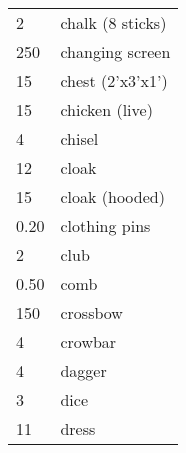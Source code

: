 \begin{normbox}[Equipment]
\begin{tabularx}{\linewidth}{@{} l X }
2 & chalk (8 sticks)\\
250 & changing screen\\
15 & chest (2'x3'x1')\\
15 & chicken (live)\\
4 & chisel\\
12 & cloak\\
15 & cloak (hooded)\\
0.20 & clothing pins\\
2 & club\\
0.50 & comb\\
150 & crossbow\\
4 & crowbar\\
4 & dagger\\
3 & dice\\
11 & dress\\
\end{tabularx}
\end{normbox}
